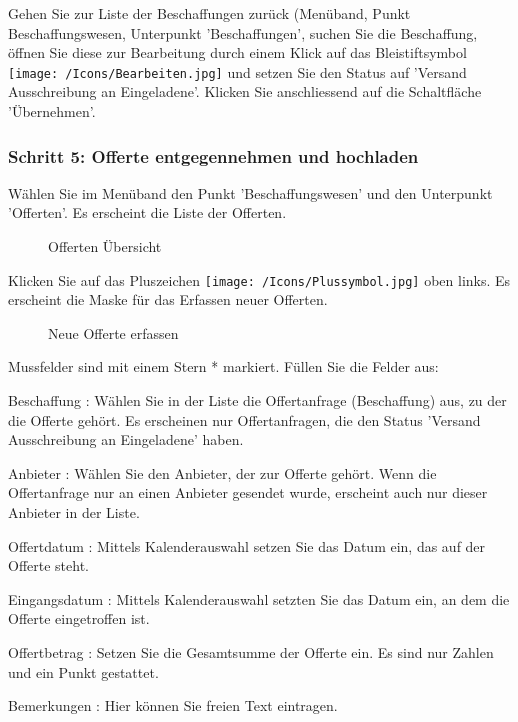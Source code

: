 Gehen Sie zur Liste der Beschaffungen zurück (Menüband, Punkt Beschaffungswesen, Unterpunkt 'Beschaffungen', suchen Sie die Beschaffung, öffnen Sie diese zur Bearbeitung durch einem Klick auf das Bleistiftsymbol \texttt{[image: /Icons/Bearbeiten.jpg]}   und setzen Sie den Status auf 'Versand Ausschreibung an Eingeladene'. Klicken Sie anschliessend auf die Schaltfläche 'Übernehmen'.

\vspace{\baselineskip}

\subsubsection{Schritt 5: Offerte entgegennehmen und hochladen}

Wählen Sie im Menüband den Punkt 'Beschaffungswesen' und den Unterpunkt 'Offerten'. Es erscheint die Liste der Offerten.

\begin{figure}[H]
\caption{Offerten Übersicht}
\end{figure}

Klicken Sie auf das Pluszeichen \texttt{[image: /Icons/Plussymbol.jpg]}  oben links. Es erscheint die Maske für das Erfassen neuer Offerten.

\begin{figure}[H]
\caption{Neue Offerte erfassen}
\end{figure}


Mussfelder sind mit einem Stern * markiert. Füllen Sie die Felder aus:

\vspace{\baselineskip}

\begin{compactitem}
\item
Beschaffung : Wählen Sie in der Liste die Offertanfrage (Beschaffung) aus, zu der die Offerte gehört. Es erscheinen nur Offertanfragen, die den Status 'Versand Ausschreibung an Eingeladene' haben.
\item
Anbieter : Wählen Sie den Anbieter, der zur Offerte gehört. Wenn die Offertanfrage nur an einen Anbieter gesendet wurde, erscheint auch nur dieser Anbieter in der Liste.
\item
Offertdatum : Mittels Kalenderauswahl setzen Sie das Datum ein, das auf der Offerte steht.
\item
Eingangsdatum : Mittels Kalenderauswahl setzten Sie das Datum ein, an dem die Offerte eingetroffen ist.
\item
Offertbetrag : Setzen Sie die Gesamtsumme der Offerte ein. Es sind nur Zahlen und ein Punkt gestattet.
\item
Bemerkungen : Hier können Sie freien Text eintragen.
\end{compactitem}

